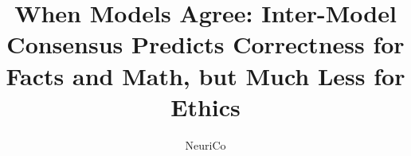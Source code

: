 \documentclass{article}
\title{When Models Agree: Inter-Model Consensus Predicts Correctness for Facts and Math, but Much Less for Ethics}
\author{NeuriCo}
\begin{document}
\maketitle

\begin{abstract}

\end{abstract}










\appendix

\end{document}
